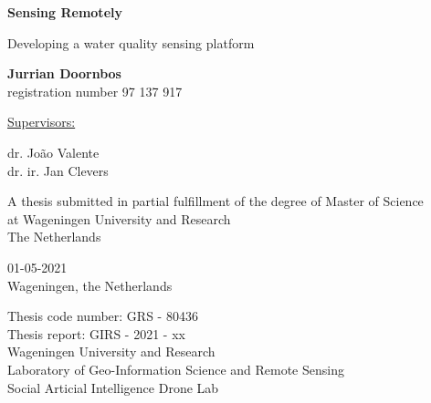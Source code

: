 \begin{titlepage}
   \begin{center}
       \vspace*{1cm}
       \LARGE

       \textbf{Sensing Remotely}

       \vspace{0.5cm}
        Developing a water quality sensing platform
            
       \vspace{1.5cm}
        \large       
        \textbf{Jurrian Doornbos}\\
        \vspace{0.5cm}
        \small
        registration number 97 137 917
        
        \vspace{1cm}
        \large
        \underline{Supervisors:}\\
        \vspace{0.5cm}
    
        \small
        dr. João Valente\\
        dr. ir. Jan Clevers

       \vfill
        
        \normalsize
       A thesis submitted in partial fulfillment of the degree of Master of Science \\ 
       at Wageningen University and Research\\
       The Netherlands
            
       \vspace{0.8cm}
            
   \end{center}
   \begin{flushright}
   01-05-2021\\
   Wageningen, the Netherlands\\
   \end{flushright}
   \vspace{0.5cm}
   \begin{flushleft}
   Thesis code number: GRS - 80436\\
   Thesis report: GIRS - 2021 - xx\\
   \vspace{0.2cm}
   Wageningen University and Research\\
   Laboratory of Geo-Information Science and Remote Sensing\\
   Social Articial Intelligence Drone Lab\\
   
   \end{flushleft}
\end{titlepage}